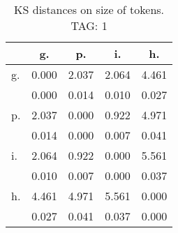 \begin{table}[h!]
\begin{center}
\begin{tabular}{| l | c | c | c | c |}\hline
 & g. & p. & i. & h. \\\hline
g. & 0.000  & 2.037  & 2.064  & 4.461 \\\hline
 & 0.000  & 0.014  & 0.010  & 0.027 \\\hline
p. & 2.037  & 0.000  & 0.922  & 4.971 \\\hline
 & 0.014  & 0.000  & 0.007  & 0.041 \\\hline
i. & 2.064  & 0.922  & 0.000  & 5.561 \\\hline
 & 0.010  & 0.007  & 0.000  & 0.037 \\\hline
h. & 4.461  & 4.971  & 5.561  & 0.000 \\\hline
 & 0.027  & 0.041  & 0.037  & 0.000 \\\hline
\end{tabular}
\caption{KS distances on size of tokens. TAG: 1}
\end{center}
\end{table}